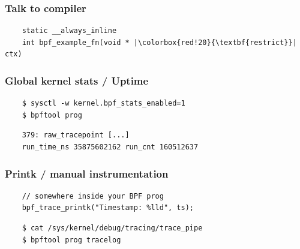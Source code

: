 \documentclass[usenames,dvipsnames, 18pt, compress, aspectratio=169]{beamer}
\begin{document}
\begin{frame}[fragile]{}
    \frametitle{Talk to compiler}

    \begin{center}
        \begin{verbatim}
    static __always_inline
    int bpf_example_fn(void * |\colorbox{red!20}{\textbf{restrict}}| ctx)
        \end{verbatim}
    \end{center}
\end{frame}

\begin{frame}[fragile]{}
    \frametitle{Global kernel stats / Uptime}

    \begin{center}
        \begin{verbatim}
    $ sysctl -w kernel.bpf_stats_enabled=1
    $ bpftool prog
        \end{verbatim}
        \vspace{0.5cm}
        \begin{verbatim}
    379: raw_tracepoint [...]
    run_time_ns 35875602162 run_cnt 160512637
        \end{verbatim}
    \end{center}
\end{frame}

\begin{frame}[fragile]{}
    \frametitle{Printk / manual instrumentation}

    \begin{center}
        \begin{verbatim}
    // somewhere inside your BPF prog
    bpf_trace_printk("Timestamp: %lld", ts);
        \end{verbatim}
        \vspace{0.5cm}
        \begin{verbatim}
    $ cat /sys/kernel/debug/tracing/trace_pipe
    $ bpftool prog tracelog
        \end{verbatim}
    \end{center}
\end{frame}
\end{document}
